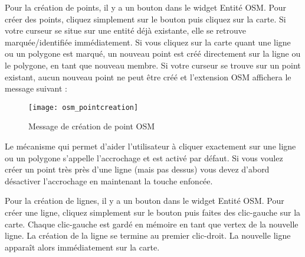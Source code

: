 Pour la création de points, il y a un bouton  dans le widget Entité OSM. Pour créer des points, cliquez simplement sur le bouton puis cliquez sur la carte. Si votre curseur se situe sur une entité déjà existante, elle se retrouve marquée/identifiée immédiatement. Si vous cliquez sur la carte quant une ligne ou un polygone est marqué, un nouveau point est créé directement sur la ligne ou le polygone, en tant que nouveau membre. Si votre curseur se trouve sur un point existant, aucun nouveau point ne peut être créé et l'extension OSM affichera le message suivant :

\begin{figure}[ht]
   \begin{center}
   \caption{Message de création de point OSM \nixcaption}\label{fig:osmpoicreat}\smallskip
   \texttt{[image: osm\_pointcreation]}
\end{center}
\end{figure}

Le mécanisme qui permet d'aider l'utilisateur à cliquer exactement sur une ligne ou un polygone s'appelle l'accrochage et est activé par défaut. Si vous voulez créer un point très près d'une ligne (mais pas dessus) vous devez d'abord désactiver l'accrochage en maintenant la touche  enfoncée.


Pour la création de lignes, il y a un bouton  dans le widget Entité OSM. Pour créer une ligne, cliquez simplement sur le bouton puis faites des clic-gauche sur la carte. Chaque clic-gauche est gardé en mémoire en tant que vertex de la nouvelle ligne. La création de la ligne se termine au premier clic-droit. La nouvelle ligne apparaît alors immédiatement sur la carte.

